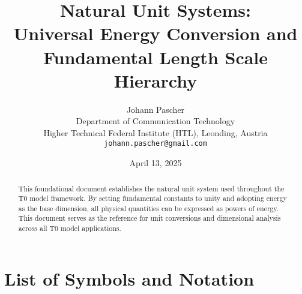 \documentclass[11pt,a4paper]{article}
\title{Natural Unit Systems:\\
	Universal Energy Conversion and\\
	Fundamental Length Scale Hierarchy}
\author{Johann Pascher\\
	Department of Communication Technology\\
	Higher Technical Federal Institute (HTL), Leonding, Austria\\
	\texttt{johann.pascher@gmail.com}}
\date{April 13, 2025}
\begin{document}
	
	\maketitle
	
	\begin{abstract}
		This foundational document establishes the natural unit system used throughout the T0 model framework. By setting fundamental constants to unity and adopting energy as the base dimension, all physical quantities can be expressed as powers of energy. This document serves as the reference for unit conversions and dimensional analysis across all T0 model applications.
	\end{abstract}
	
	\tableofcontents
	\newpage
	
	\section{List of Symbols and Notation}
	
\end{document}
